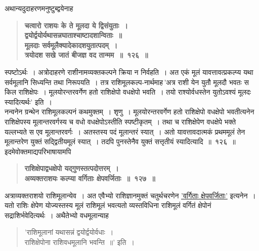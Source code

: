 \documentclass[11pt, openany]{book}
\begin{document}
\begin{sloppypar}
{\small अथान्यदुदाहरणमनुष्टुब्द्वयेनाह\textendash }

 \label{8.126}
\begin{quote}
{\large \textbf{{\color{purple}चत्वारो राशयः के ते मूलदा ये द्विसंयुताः~।\\
द्वयोर्द्वयोर्यथासन्नघाताश्चाष्टादशान्विताः~॥\\
मूलदाः सर्वमूलैक्यादेकादशयुतात्पदम्~।\\
त्रयोदश सखे जातं बीजज्ञ वद तान्मम~॥~१२६~॥}}}
\end{quote}

स्पष्टोऽर्थः~। अत्रोदाहरणे राशीनामव्यक्तकल्पने क्रिया न निर्वहति~। अत एकं मूलं यावत्तावत्प्रकल्प्य यथा सर्वमूलानि सिध्यन्ति तथा निरूपयति~। तत्र राशिमूलकल्प-नार्थमाह\textendash \,'अत्र राशी येन युतौ मूलदौ भवतः स किल राशिक्षेपः~। मूलयोरन्तरवर्गेण हतो राशिक्षेपो वधक्षेपो भवति~। तयो राश्योर्वधस्तेन युतोऽवश्यं मूलदः स्यादित्यर्थः' इति~।\\

नन्वनेन ग्रन्थेन राशिमूलकल्पनं कथमुक्तम्~। शृणु~। मूलयोरन्तरवर्गेण हतो राशिक्षेपो वधक्षेपो भवतीत्यनेन राशिक्षेपस्य मूलान्तरवर्गस्य च वधो वधक्षेपोऽस्तीति स्पष्टीकृतम्~। तथा च राशिक्षेपेण वधक्षेपे भक्ते यल्लभ्यते स एव मूलान्तरवर्गः~। अतस्तस्य पदं मूलान्तरं स्यात्~। अतो यावत्तावदात्मकं प्रथममूलं तेन मूलान्तरेण युक्तं सद्द्वितीयमूलं स्यात्~। तदपि पुनस्तेनैव युक्तं सत्तृतीयं स्यादित्यादि~॥~१२६~॥\\

{\small इदमेवोक्तमाद्यपरिभाषायामपि\textendash }

 \label{8.127}
\begin{quote}
{\large \textbf{{\color{purple}राशिक्षेपाद्वधक्षेपो यद्गुणस्तत्पदोत्तरम्~।\\
अव्यक्तराशयः कल्प्या वर्गिताः क्षेपवर्जिताः~॥~१२७~॥}}}
\end{quote}

अत्राव्यक्तराशयो राशिमूलान्येव~। अत एवैभ्यो राशिज्ञानमुक्तं चतुर्थचरणेन \hyperref[8.127]{'वर्गिताः क्षेपवर्जिताः'} इत्यनेन~। यतो राशिः क्षेपेण योज्यस्तस्य मूलं राशिमूलं भवत्यतो व्यस्तविधिना राशिमूलं वर्गितं क्षेपोनं सद्राशिर्भवेदित्यर्थः~। अथैतेभ्यो वधमूलान्याह\textendash
\vspace{-1mm}

\begin{quote}
{\color{violet}'राशिमूलानां यथासन्नं द्वयोर्द्वयोर्वधाः~।\\
राशिक्षेपोना राशिवधमूलानि भवन्ति~॥'} इति~।
\end{quote}
\vspace{-1mm}


\end{sloppypar}
\end{document}
